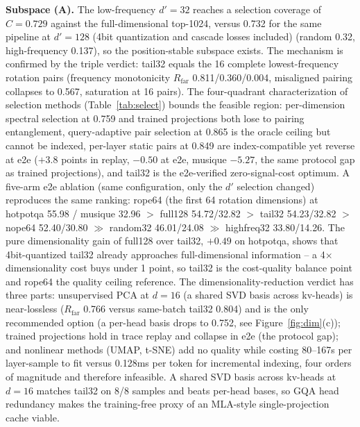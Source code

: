 \documentclass[11pt]{article}
\begin{document}
\textbf{Subspace (A).} The low-frequency $d'{=}32$ reaches a selection coverage of $C{=}0.729$ against the full-dimensional top-1024, versus 0.732 for the same pipeline at $d'{=}128$ (4bit quantization and cascade losses included) (random 0.32, high-frequency 0.137), so the position-stable subspace exists. The mechanism is confirmed by the triple verdict: tail32 equals the 16 complete lowest-frequency rotation pairs (frequency monotonicity $R_{\mathrm{far}}$ 0.811/0.360/0.004, misaligned pairing collapses to 0.567, saturation at 16 pairs). The four-quadrant characterization of selection methods (Table~\ref{tab:select}) bounds the feasible region: per-dimension spectral selection at 0.759 and trained projections both lose to pairing entanglement, query-adaptive pair selection at 0.865 is the oracle ceiling but cannot be indexed, per-layer static pairs at 0.849 are index-compatible yet reverse at e2e ($+3.8$ points in replay, $-0.50$ at e2e, musique $-5.27$, the same protocol gap as trained projections), and tail32 is the e2e-verified zero-signal-cost optimum. A five-arm e2e ablation (same configuration, only the $d'$ selection changed) reproduces the same ranking: rope64 (the first 64 rotation dimensions) at hotpotqa 55.98 / musique 32.96 $>$ full128 54.72/32.82 $>$ tail32 54.23/32.82 $>$ nope64 52.40/30.80 $\gg$ random32 46.01/24.08 $\gg$ highfreq32 33.80/14.26. The pure dimensionality gain of full128 over tail32, $+0.49$ on hotpotqa, shows that 4bit-quantized tail32 already approaches full-dimensional information -- a 4$\times$ dimensionality cost buys under 1 point, so tail32 is the cost-quality balance point and rope64 the quality ceiling reference. The dimensionality-reduction verdict has three parts: unsupervised PCA at $d{=}16$ (a shared SVD basis across kv-heads) is near-lossless ($R_{\mathrm{far}}$ 0.766 versus same-batch tail32 0.804) and is the only recommended option (a per-head basis drops to 0.752, see Figure~\ref{fig:dim}(c)); trained projections hold in trace replay and collapse in e2e (the protocol gap); and nonlinear methods (UMAP, t-SNE) add no quality while costing 80--167s per layer-sample to fit versus 0.128ms per token for incremental indexing, four orders of magnitude and therefore infeasible. A shared SVD basis across kv-heads at $d{=}16$ matches tail32 on 8/8 samples and beats per-head bases, so GQA head redundancy makes the training-free proxy of an MLA-style single-projection cache viable.
\end{document}
